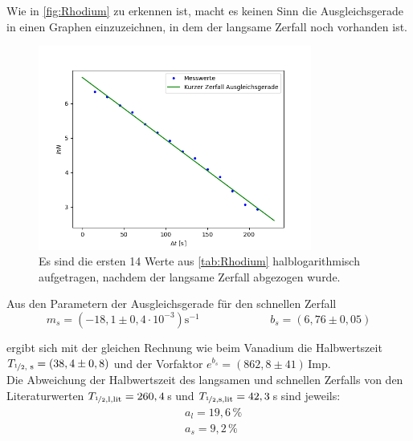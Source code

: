         Wie in \autoref{fig:Rhodium} zu erkennen ist, macht es keinen Sinn die Ausgleichsgerade in einen Graphen einzuzeichnen, in dem der langsame Zerfall noch vorhanden ist.
        \begin{figure}[h]
            \centering
            \includegraphics[width = 0.8\textwidth]{pictures/HalbwertszeitGraph_Rhodium_kurzlebig.png}
            \caption{Es sind die ersten 14 Werte aus \autoref{tab:Rhodium} halblogarithmisch aufgetragen, nachdem der langsame Zerfall abgezogen wurde.}
            \label{fig:RhodiumSchnell}
        \end{figure}

        \FloatBarrier

        Aus den Parametern der Ausgleichsgerade für den schnellen Zerfall
        \begin{equation*}
            m_s = (-18,1 \pm 0,4 \cdot 10^{-3}) \text{s}^{-1} \hspace{75pt} b_s = (6,76 \pm 0,05)
        \end{equation*}

        ergibt sich mit der gleichen Rechnung wie beim Vanadium die Halbwertszeit $T_{\nicefrac{1}{2} \text{, s}} = (38,4 \pm 0,8)$ und der Vorfaktor $e^{b_s} = (862,8 \pm 41) \,$Imp. \\

        Die Abweichung der Halbwertszeit des langsamen und schnellen Zerfalls von den Literaturwerten $T_{\nicefrac{1}{2} \text{,l,lit}} = 260,4 \,$s und $T_{\nicefrac{1}{2} \text{,s,lit}} = 42,3 \,$s sind jeweils:
        \begin{align*}
            &a_l = 19,6 \, \% \\
            &a_s = 9,2 \, \%
        \end{align*}

